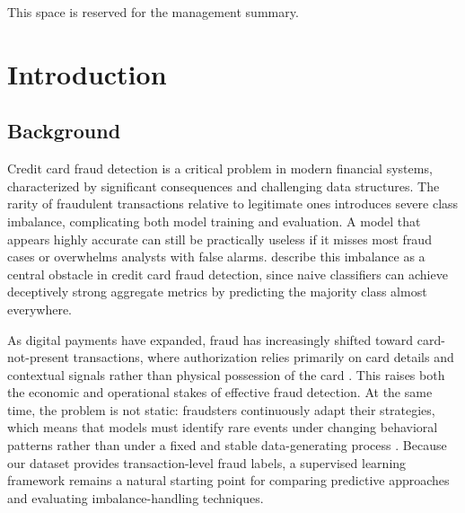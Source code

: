 \documentclass[oneside,12pt,parskip=half,american,numbers=noenddot]{scrreprt}
\renewcommand*{\chapterpagestyle}{frontmatter} %
\begin{document}
This space is reserved for the management summary.

\newpage

\renewcommand{\contentsname}{\textbf{Table of Contents}}
\tableofcontents
\thispagestyle{frontmatter}
\newpage

\renewcommand{\listtablename}{\textbf{List of Tables}}
\listoftables
\thispagestyle{frontmatter}
\newpage

\renewcommand{\listfigurename}{\textbf{List of Figures}}
\listoffigures
\thispagestyle{frontmatter}
\newpage

\setcounter{page}{1}

\pagestyle{mainmatter}
\renewcommand*{\chapterpagestyle}{mainmatter}

\onehalfspacing

\chapter{Introduction}\label{Introduction}

\section{Background}\label{Background}
Credit card fraud detection is a critical problem in modern financial systems, characterized by significant consequences and challenging data structures. The rarity of fraudulent transactions relative to legitimate ones introduces severe class imbalance, complicating both model training and evaluation. A model that appears highly accurate can still be practically useless if it misses most fraud cases or overwhelms analysts with false alarms. \textcite{gunjan_credit_2022} describe this imbalance as a central obstacle in credit card fraud detection, since naive classifiers can achieve deceptively strong aggregate metrics by predicting the majority class almost everywhere.

As digital payments have expanded, fraud has increasingly shifted toward card-not-present transactions, where authorization relies primarily on card details and contextual signals rather than physical possession of the card \parencite{xuan_random_2018}. This raises both the economic and operational stakes of effective fraud detection. At the same time, the problem is not static: fraudsters continuously adapt their strategies, which means that models must identify rare events under changing behavioral patterns rather than under a fixed and stable data-generating process \parencite{afriyie_supervised_2023}. Because our dataset provides transaction-level fraud labels, a supervised learning framework remains a natural starting point for comparing predictive approaches and evaluating imbalance-handling techniques.
\end{document}

